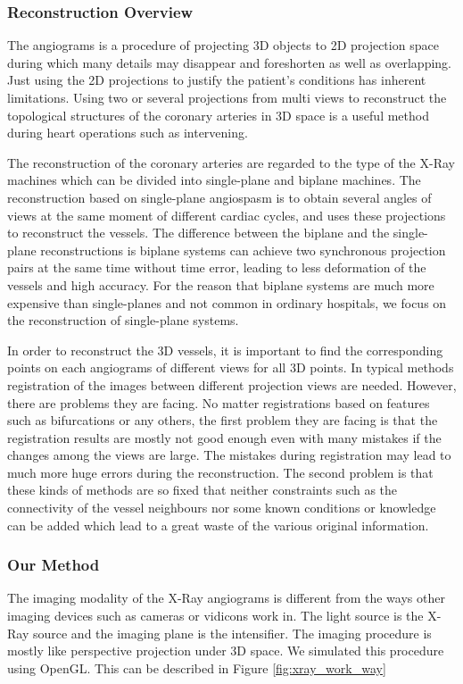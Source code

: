 \subsubsection{Reconstruction Overview}

The angiograms is a procedure of projecting 3D objects to 2D
projection space during which many details may disappear and
foreshorten as well as overlapping. Just using the 2D projections to
justify the patient's conditions has inherent limitations. Using two
or several projections from multi views to reconstruct the topological
structures of the coronary arteries in 3D space is a useful method
during heart operations such as intervening.

The reconstruction of the coronary arteries are regarded to the type
of the X-Ray machines which can be divided into single-plane and
biplane machines. The reconstruction based on single-plane angiospasm
is to obtain several angles of views at the same moment of different
cardiac cycles, and uses these projections to reconstruct the vessels.
The difference between the biplane and the single-plane
reconstructions is biplane systems can achieve two synchronous
projection pairs at the same time without time error, leading to less
deformation of the vessels and high accuracy. For the reason that
biplane systems are much more expensive than single-planes and not common
in ordinary hospitals, we focus on the reconstruction of single-plane systems.

In order to reconstruct the 3D vessels, it is important to find the
corresponding points on each angiograms of different views for all 3D
points. In typical methods registration of the images between
different projection views are needed. However, there are problems
they are facing. No matter registrations based on features such as
bifurcations or any others, the first problem they are facing is that
the registration results are mostly not good enough even with many mistakes if
the changes among the views are large. The mistakes during
registration may lead to much more huge errors during the
reconstruction. The second problem is that these kinds of methods are
so fixed that neither constraints such as the connectivity of the
vessel neighbours nor some known conditions or knowledge can be added
which lead to a great waste of the various original information.

\subsubsection{Our Method}
The imaging modality of the X-Ray angiograms is different from the
ways other imaging devices such as cameras or vidicons work in. The
light source is the X-Ray source and the imaging plane is the
intensifier. The imaging procedure is mostly like perspective
projection under 3D space. We simulated this procedure using OpenGL.
This can be described in Figure \ref{fig:xray_work_way}

